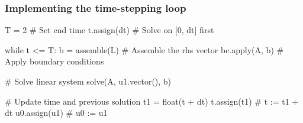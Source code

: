 \begin{frame}[fragile]
  \frametitle{Implementing the time-stepping loop}

\begin{python}
T = 2        # Set end time
t.assign(dt) # Solve on [0, dt] first

while t <= T:
    b = assemble(L)  # Assemble the rhs vector
    bc.apply(A, b)   # Apply boundary conditions

    # Solve linear system
    solve(A, u1.vector(), b)

    # Update time and previous solution
    t1 = float(t + dt)
    t.assign(t1)        # t := t1 + dt
    u0.assign(u1)       # u0 := u1
\end{python}

\end{frame}
